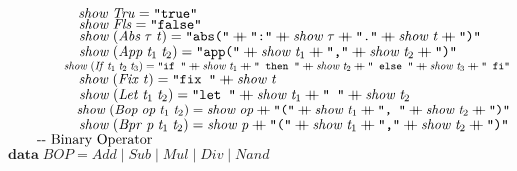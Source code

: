 \documentclass[10pt]{article}
\newcommand{\Conid}[1]{\mathit{#1}}
\newcommand{\Varid}[1]{\mathit{#1}}
\newcommand{\plus}{\mathbin{+\!\!\!+}}
\begin{document}
\begin{hscode}
${\hskip5.00em\relax\Varid{show}\;\Conid{Tru}\mathrel{=}\text{\tt \char34 true\char34}}$\\
${\hskip5.00em\relax\Varid{show}\;\Conid{Fls}\mathrel{=}\text{\tt \char34 false\char34}}$\\
${\hskip5.00em\relax\Varid{show}\;(\Conid{Abs}\;\tau\;\Varid{t})\mathrel{=}\text{\tt \char34 abs(\char34}\plus \text{\tt \char34 :\char34}\plus \Varid{show}\;\tau\plus \text{\tt \char34 .\char34}\plus \Varid{show}\;\Varid{t}\plus \text{\tt \char34 )\char34}}$\\
${\hskip5.00em\relax\Varid{show}\;(\Conid{App}\;\Varid{t}_{1}\;\Varid{t}_{2})\mathrel{=}\text{\tt \char34 app(\char34}\plus \Varid{show}\;\Varid{t}_{1}\plus \text{\tt \char34 ,\char34}\plus \Varid{show}\;\Varid{t}_{2}\plus \text{\tt \char34 )\char34}}$\\
${\hskip5.00em\relax\Varid{show}\;(\Conid{If}\;\Varid{t}_{1}\;\Varid{t}_{2}\;\Varid{t}_{3})\mathrel{=}\text{\tt \char34 if~\char34}\plus \Varid{show}\;\Varid{t}_{1}\plus \text{\tt \char34 ~then~\char34}\plus \Varid{show}\;\Varid{t}_{2}\plus \text{\tt \char34 ~else~\char34}\plus \Varid{show}\;\Varid{t}_{3}\plus \text{\tt \char34 ~fi\char34}}$\\
${\hskip5.00em\relax\Varid{show}\;(\Conid{Fix}\;\Varid{t})\mathrel{=}\text{\tt \char34 fix~\char34}\plus \Varid{show}\;\Varid{t}}$\\
${\hskip5.00em\relax\Varid{show}\;(\Conid{Let}\;\Varid{t}_{1}\;\Varid{t}_{2})\mathrel{=}\text{\tt \char34 let~\char34}\plus \Varid{show}\;\Varid{t}_{1}\plus \text{\tt \char34 ~\char34}\plus \Varid{show}\;\Varid{t}_{2}}$\\
${\hskip5.00em\relax\Varid{show}\;(\Conid{Bop}\;\Varid{op}\;\Varid{t}_{1}\;\Varid{t}_{2})\mathrel{=}\Varid{show}\;\Varid{op}\plus \text{\tt \char34 (\char34}\plus \Varid{show}\;\Varid{t}_{1}\plus \text{\tt \char34 ,~\char34}\plus \Varid{show}\;\Varid{t}_{2}\plus \text{\tt \char34 )\char34}}$\\
${\hskip5.00em\relax\Varid{show}\;(\Conid{Bpr}\;\Varid{p}\;\Varid{t}_{1}\;\Varid{t}_{2})\mathrel{=}\Varid{show}\;\Varid{p}\plus \text{\tt \char34 (\char34}\plus \Varid{show}\;\Varid{t}_{1}\plus \text{\tt \char34 ,\char34}\plus \Varid{show}\;\Varid{t}_{2}\plus \text{\tt \char34 )\char34}}$\\
${}$\\
${\mbox{\qquad-{}-  Binary Operator }}$\\
${\mathbf{data}\;\Conid{BOP}\mathrel{=}\Conid{Add}\mid \Conid{Sub}\mid \Conid{Mul}\mid \Conid{Div}\mid \Conid{Nand}}$\\

\end{hscode}
\end{document}

